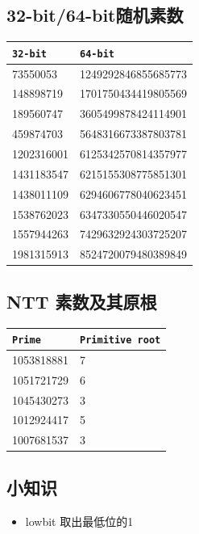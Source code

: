 \documentclass[landscape,a4paper]{article}
\begin{document}
\begin{spacing}{0.3}
\begin{multicols}{2}
\subsection{32-bit/64-bit随机素数}
\begin{tabular}{|l|l|}
\hline
\texttt{32-bit} & \texttt{64-bit} \\
\hline
73550053 & 1249292846855685773 \\
\hline
148898719 & 1701750434419805569 \\
\hline
189560747 & 3605499878424114901 \\
\hline
459874703 & 5648316673387803781 \\
\hline
1202316001 & 6125342570814357977 \\
\hline
1431183547 & 6215155308775851301 \\
\hline
1438011109 & 6294606778040623451 \\
\hline
1538762023 & 6347330550446020547 \\
\hline
1557944263 & 7429632924303725207 \\
\hline
1981315913 & 8524720079480389849 \\
\hline
\end{tabular}

\subsection{NTT 素数及其原根}
\begin{tabular}{|l|l|}
\hline
\texttt{Prime} & \texttt{Primitive root} \\
\hline
1053818881 & 7 \\
\hline
1051721729 & 6 \\
\hline
1045430273 & 3 \\
\hline
1012924417 & 5 \\
\hline
1007681537 & 3 \\
\hline
\end{tabular}

\subsection{小知识}
\begin{itemize}	

\item lowbit 取出最低位的1


\end{itemize}
\end{multicols}
\end{spacing}
\end{document}
